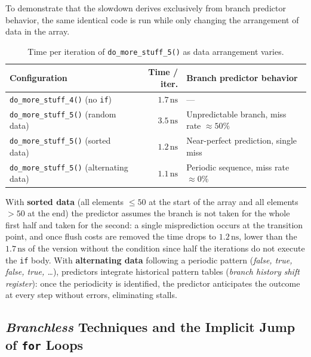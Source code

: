 To demonstrate that the slowdown derives exclusively from branch predictor behavior, the same identical code is run while only changing the arrangement of data in the array.

\begin{table}[H]
  \centering
  \small
  \setlength{\tabcolsep}{5pt}
  \begin{tabularx}{\textwidth}{l r Y}
    \toprule
    \textbf{Configuration} & \textbf{Time / iter.} & \textbf{Branch predictor behavior} \\
    \midrule
    \texttt{do\_more\_stuff\_4()} (no \texttt{if}) & $1.7\,\text{ns}$ & --- \\
    \texttt{do\_more\_stuff\_5()} (random data)    & $3.5\,\text{ns}$ & Unpredictable branch, miss rate $\approx 50\%$ \\
    \texttt{do\_more\_stuff\_5()} (sorted data)    & $1.2\,\text{ns}$ & Near-perfect prediction, single miss \\
    \texttt{do\_more\_stuff\_5()} (alternating data)& $1.1\,\text{ns}$ & Periodic sequence, miss rate $\approx 0\%$ \\
    \bottomrule
  \end{tabularx}
  \caption{Time per iteration of \texttt{do\_more\_stuff\_5()} as data arrangement varies.}
  \label{tab:branch-prediction-benchmark-en}
\end{table}

With \textbf{sorted data} (all elements $\le 50$ at the start of the array and all elements $> 50$ at the end) the predictor assumes the branch is not taken for the whole first half and taken for the second: a single misprediction occurs at the transition point, and once flush costs are removed the time drops to $1.2\,\text{ns}$, lower than the $1.7\,\text{ns}$ of the version without the condition since half the iterations do not execute the \texttt{if} body. With \textbf{alternating data} following a periodic pattern (\textit{false, true, false, true, \ldots}), predictors integrate historical pattern tables (\textit{branch history shift register}): once the periodicity is identified, the predictor anticipates the outcome at every step without errors, eliminating stalls.

\subsection{\textit{Branchless} Techniques and the Implicit Jump of \texttt{for} Loops}

